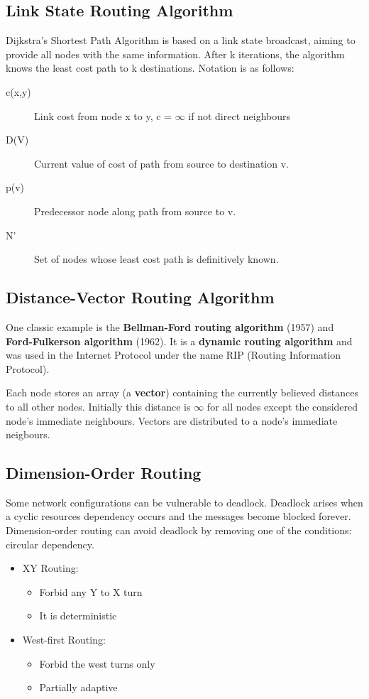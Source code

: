 \documentclass[11pt]{article}
\begin{document}
\subsection{Link State Routing Algorithm}
\label{sec:orgc9863c3}
Dijkstra's Shortest Path Algorithm is based on a link state broadcast, aiming to provide all nodes with the same information.
After k iterations, the algorithm knows the least cost path to k destinations.
Notation is as follows:
\begin{description}
\item[{c(x,y)}] Link cost from node x to y, c = \(\infty\) if not direct neighbours
\item[{D(V)}] Current value of cost of path from source to destination v.
\item[{p(v)}] Predecessor node along path from source to v.
\item[{N'}] Set of nodes whose least cost path is definitively known.
\end{description}

\subsection{Distance-Vector Routing Algorithm}
\label{sec:orgeede7e1}
One classic example is the \textbf{Bellman-Ford routing algorithm} (1957) and \textbf{Ford-Fulkerson algorithm} (1962).
It is a \textbf{dynamic routing algorithm} and was used in the Internet Protocol under the name RIP (Routing Information Protocol).

Each node stores an array (a \textbf{vector}) containing the currently believed distances to all other nodes.
Initially this distance is \(\infty\) for all nodes except the considered node's immediate neighbours.
Vectors are distributed to a node's immediate neigbours.




\subsection{Dimension-Order Routing}
\label{sec:org650a32b}
Some network configurations can be vulnerable to deadlock.
Deadlock arises when a cyclic resources dependency occurs and the messages become blocked forever.
Dimension-order routing can avoid deadlock by removing one of the conditions: circular dependency.
\begin{itemize}
\item XY Routing:
\begin{itemize}
\item Forbid any Y to X turn
\item It is deterministic
\end{itemize}
\item West-first Routing:
\begin{itemize}
\item Forbid the west turns only
\item Partially adaptive
\end{itemize}
\end{itemize}
\end{document}
